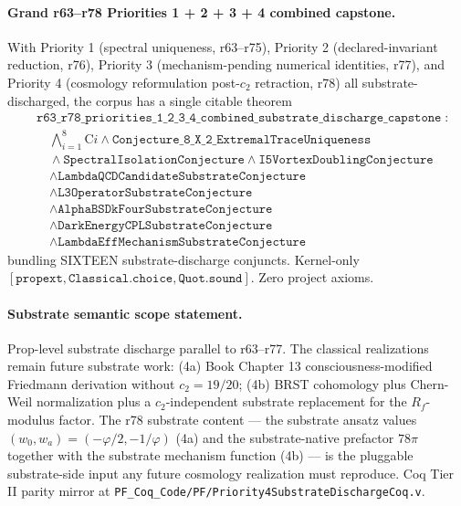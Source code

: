 \documentclass[11pt,a4paper]{amsart}
\theoremstyle{plain}
\theoremstyle{definition}
\begin{document}
\paragraph{Grand r63--r78 Priorities 1 + 2 + 3 + 4 combined capstone.} With Priority 1 (spectral uniqueness, r63--r75), Priority 2 (declared-invariant reduction, r76), Priority 3 (mechanism-pending numerical identities, r77), and Priority 4 (cosmology reformulation post-$c_2$ retraction, r78) all substrate-discharged, the corpus has a single citable theorem
\[
\begin{split}
& \texttt{r63\_r78\_priorities\_1\_2\_3\_4\_combined\_substrate\_discharge\_capstone}\;: \\
& \quad \bigwedge_{i=1}^{8} \text{C}i \wedge \texttt{Conjecture\_8\_X\_2\_ExtremalTraceUniqueness} \\
& \quad \wedge \texttt{SpectralIsolationConjecture} \wedge \texttt{I5VortexDoublingConjecture} \\
& \quad \wedge \texttt{LambdaQCDCandidateSubstrateConjecture} \\
& \quad \wedge \texttt{L3OperatorSubstrateConjecture} \\
& \quad \wedge \texttt{AlphaBSDkFourSubstrateConjecture} \\
& \quad \wedge \texttt{DarkEnergyCPLSubstrateConjecture} \\
& \quad \wedge \texttt{LambdaEffMechanismSubstrateConjecture}
\end{split}
\]
bundling SIXTEEN substrate-discharge conjuncts. Kernel-only $[\texttt{propext}, \texttt{Classical.choice}, \texttt{Quot.sound}]$. Zero project axioms.

\paragraph{Substrate semantic scope statement.} Prop-level substrate discharge parallel to r63--r77. The classical realizations remain future substrate work: (4a) Book Chapter 13 consciousness-modified Friedmann derivation without $c_2 = 19/20$; (4b) BRST cohomology plus Chern-Weil normalization plus a $c_2$-independent substrate replacement for the $R_f$-modulus factor. The r78 substrate content --- the substrate ansatz values $(w_0, w_a) = (-\varphi/2, -1/\varphi)$ (4a) and the substrate-native prefactor $78\pi$ together with the substrate mechanism function (4b) --- is the pluggable substrate-side input any future cosmology realization must reproduce. Coq Tier II parity mirror at \texttt{PF\_Coq\_Code/PF/Priority4SubstrateDischargeCoq.v}.
\end{document}
